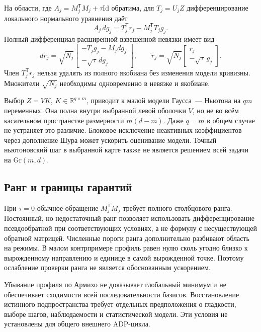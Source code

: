 \documentclass[11pt,a4paper]{article}
\numberwithin{equation}{section}
\newcommand{\R}{\mathbb R}
\newcommand{\Id}{\mathrm{Id}}
\newcommand{\T}{^{\mathsf T}}
\begin{document}
На области, где $A_j=M_j\T M_j+\tau\Id$ обратима, для
$T_j=U_jZ$ дифференцирование локального нормального уравнения даёт
\begin{equation}\label{eq:dg}
 A_j\,dg_j=T_j\T r_j-M_j\T T_jg_j.
\end{equation}
Полный дифференциал расширенной взвешенной невязки имеет вид
\begin{equation}\label{eq:jac}
 d\widetilde r_j=\sqrt{N_j}
 \begin{bmatrix}-T_jg_j-M_jdg_j\\-\sqrt\tau\,dg_j\end{bmatrix},
 \qquad
 \widetilde r_j=\sqrt{N_j}
 \begin{bmatrix}r_j\\-\sqrt\tau\,g_j\end{bmatrix}.
\end{equation}
Член $T_j\T r_j$ нельзя удалять из полного якобиана без изменения
модели кривизны. Множители $\sqrt{N_j}$ необходимы одновременно
в невязке и якобиане.

Выбор $Z=VK$, $K\in\R^{q\times m}$, приводит к малой модели
Гаусса~--- Ньютона на $qm$ переменных. Она полна внутри выбранной
левой оболочки $V$, но не во всём касательном пространстве размерности
$m(d-m)$. Даже $q=m$ в общем случае не устраняет это различие.
Блоковое исключение неактивных коэффициентов через дополнение Шура
может ускорить оценивание модели. Точный ньютоновский шаг в выбранной
карте также не является решением всей задачи на $\mathrm{Gr}(m,d)$.
\cite{unified,structurednote,glmcheck}

\subsection{Ранг и границы гарантий}

При $\tau=0$ обычное обращение $M_j\T M_j$ требует полного
столбцового ранга. Постоянный, но недостаточный ранг позволяет
использовать дифференцирование псевдообратной при соответствующих
условиях, а не формулу с несуществующей обратной матрицей.
Численные пороги ранга дополнительно разбивают область на режимы.
В малом контрпримере профиль равен нулю сколь угодно близко
к вырожденному направлению и единице в самой вырожденной точке.
Поэтому ослабление проверки ранга не является обоснованным ускорением.

Убывание профиля по Армихо не доказывает глобальный минимум
и не обеспечивает сходимости всей последовательности базисов.
Восстановление истинного подпространства требует отдельных
предположения о гладкости, выборе шагов, наблюдаемости и статистической
модели. Эти условия не установлены для общего внешнего ADP-цикла.
\cite{theorychecks,glmcheck}
\end{document}
